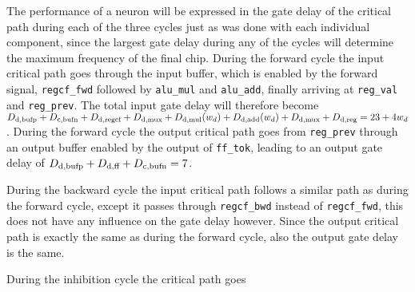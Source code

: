 The performance of a neuron will be expressed in the gate delay of the critical path during each of the three cycles just as was done with each individual component, since the largest gate delay during any of the cycles will determine the maximum frequency of the final chip. During the forward cycle the input critical path goes through the input buffer, which is enabled by the forward signal, \texttt{regcf\_fwd} followed by \texttt{alu\_mul} and \texttt{alu\_add}, finally arriving at \texttt{reg\_val} and \texttt{reg\_prev}. The total input gate delay will therefore become $\f{D}{d}{bufp} + \f{D}{c}{bufn} + \f{D}{d}{regcf} + \f{D}{d}{mux} + \f{D}{d}{mul}(w_{d}) + \f{D}{d}{add}(w_{d}) + \f{D}{d}{mux} + \f{D}{d}{reg} = 23 + 4w_{d}$. During the forward cycle the output critical path goes from \texttt{reg\_prev} through an output buffer enabled by the output of \texttt{ff\_tok}, leading to an output gate delay of $\f{D}{d}{bufp} + \f{D}{d}{ff} + \f{D}{c}{bufn} = 7$.

During the backward cycle the input critical path follows a similar path as during the forward cycle, except it passes through \texttt{regcf\_bwd} instead of \texttt{regcf\_fwd}, this does not have any influence on the gate delay however. Since the output critical path is exactly the same as during the forward cycle, also the output gate delay is the same.

During the inhibition cycle the critical path goes


